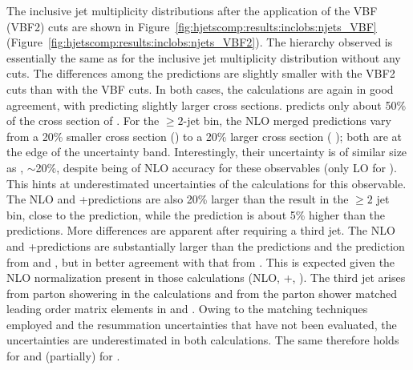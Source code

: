 The inclusive jet multiplicity distributions after the application of
the VBF (VBF2) cuts are shown in
Figure~\ref{fig:hjetscomp:results:inclobs:njets_VBF}
(Figure~\ref{fig:hjetscomp:results:inclobs:njets_VBF2}).  The
hierarchy observed is essentially the same as for the inclusive jet
multiplicity distribution without any cuts. The differences among the
predictions are slightly smaller with the VBF2 cuts than with the VBF
cuts.  In both cases, the \hjetscompNNLOPS calculations are again in good 
agreement, with \hjetscompSherpa \hjetscompNNLOPS predicting slightly larger cross sections.
\hjetscompHej predicts only about 50\% of the cross section of \hjetscompNNLOPS.
For the $\ge2$-jet bin, the NLO merged predictions vary from a 20\%
smaller cross section (\hjetscompMGaMC) to a 20\% larger cross section (\hjetscompSherpa
\hjetscompMEPSatNLO); both are at the edge of the \hjetscompNNLOPS uncertainty
band. Interestingly, their uncertainty is of similar size as \hjetscompNNLOPS,
$\sim$20\%, despite being of NLO accuracy for these observables (only
LO for \hjetscompNNLOPS). This hints at underestimated uncertainties of the
\hjetscompNNLOPS calculations for this observable. The NLO and \hjetscompMinlo
\hjetscompGoSam{}+\hjetscompSherpa predictions are also 20\% larger than the \hjetscompNNLOPS
result in the $\ge2$ jet bin, close to the \hjetscompSherpa \hjetscompMEPSatNLO
prediction, while the \hjetscompLoopsim prediction is about 5\% higher than the
\hjetscompNNLOPS predictions.
More differences are apparent after requiring a third jet. The NLO and
\hjetscompMinlo \hjetscompGoSam{}+\hjetscompSherpa predictions are substantially larger than the
\hjetscompNNLOPS predictions and the prediction from \hjetscompMGaMC and \hjetscompHerwig, but in better
agreement with that from \hjetscompSherpa \hjetscompMEPSatNLO. This is expected given
the NLO normalization present in those calculations (NLO,\hjetscompMinlo
\hjetscompGoSam{}+\hjetscompSherpa, \hjetscompSherpa \hjetscompMEPSatNLO). The third jet arises from parton
showering in the \hjetscompNNLOPS calculations and from the parton shower matched 
leading order matrix elements in \hjetscompMGaMC and \hjetscompHerwig. Owing to the  
matching techniques employed and the  resummation uncertainties that have not been evaluated, 
the uncertainties are underestimated in both calculations. The same 
therefore holds for \hjetscompPowheg \hjetscompNNLOPS and (partially) for \hjetscompSherpa 
\hjetscompNNLOPS. 

